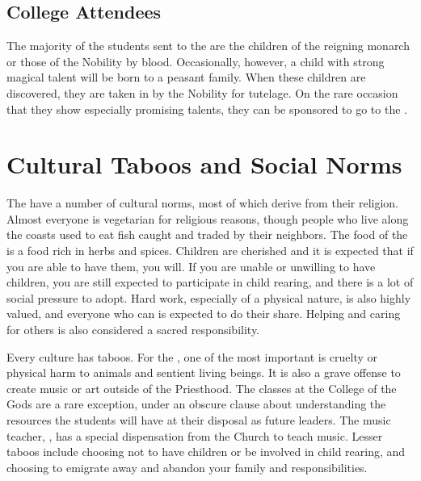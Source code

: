 \documentclass[blue]{GL2020}
\begin{document}
\subsection*{College Attendees}
The majority of the students sent to the \pSchool{} are the children of the reigning monarch or those of the Nobility by blood.  Occasionally, however, a child with strong magical talent will be born to a peasant family.  When these children are discovered, they are taken in by the Nobility for tutelage.  On the rare occasion that they show especially promising talents, they can be sponsored to go to the \pSchool{}.

\section*{Cultural Taboos and Social Norms}
The \pFarm{} have a number of cultural norms, most of which derive from their religion.  Almost everyone is vegetarian for religious reasons, though people who live along the coasts used to eat fish caught and traded by their \pShip{} neighbors.  The food of the \pFarm{} is a food rich in herbs and spices.  Children are cherished and it is expected that if you are able to have them, you will.  If you are unable or unwilling to have children, you are still expected to participate in child rearing, and there is a lot of social pressure to adopt.  Hard work, especially of a physical nature, is also highly valued, and everyone who can is expected to do their share.  Helping and caring for others is also considered a sacred responsibility.

Every culture has taboos.  For the \pFarmers{}, one of the most important is cruelty or physical harm to animals and sentient living beings.  It is also a grave offense to create music or art outside of the Priesthood.  The classes at the College of the Gods are a rare exception, under an obscure clause about understanding the resources the students will have at their disposal as future leaders.  The music teacher, \cMusic{\full}, has a special dispensation from the Church to teach music.  Lesser taboos include choosing not to have children or be involved in child rearing, and choosing to emigrate away and abandon your family and responsibilities.
\end{document}
